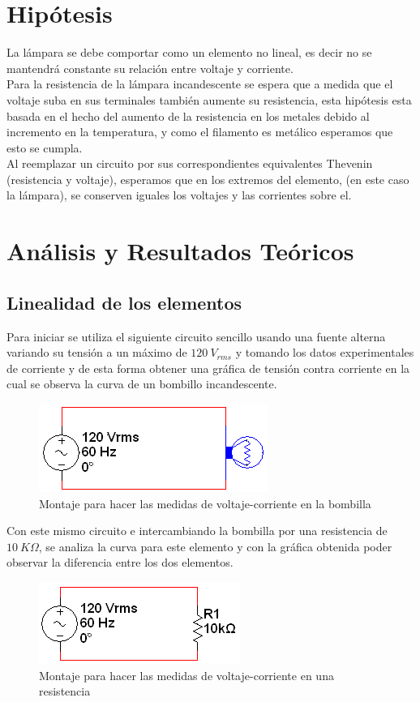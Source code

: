 \documentclass[twocolumn]{IEEEtran}
\begin{document}
\section{Hipótesis}
\noindent
La lámpara se debe comportar como un elemento no lineal, es decir no se mantendrá constante su relación entre voltaje y corriente. \\
Para la resistencia de la lámpara incandescente se espera que a medida que el voltaje suba en sus terminales también aumente su resistencia, esta hipótesis esta basada  en el hecho del aumento de la resistencia en los metales debido al incremento en la temperatura, y como el filamento es metálico esperamos que esto se cumpla.\\
Al reemplazar un circuito por sus correspondientes equivalentes Thevenin (resistencia y voltaje), esperamos que en los extremos del  elemento, (en este caso la lámpara), se conserven iguales los voltajes y las corrientes sobre el.


\section{Análisis y Resultados Teóricos}
\subsection{Linealidad de los elementos}
\noindent
Para iniciar se utiliza el siguiente circuito sencillo usando una fuente  alterna variando su tensión a un máximo de $120 \ V_{rms}$ y tomando los datos experimentales de corriente y de esta forma obtener una gráfica de tensión contra corriente en la cual se observa la curva de un bombillo incandescente.
\begin{figure}[H]
	\centering
		\includegraphics[scale=1]{b1.png}
	\caption{Montaje para hacer las medidas de voltaje-corriente en la bombilla}
	\label{fig3}
\end{figure}
\noindent
Con este mismo circuito e intercambiando la bombilla por una resistencia de $10 \ K \Omega$, se analiza la curva para este elemento y con la gráfica obtenida poder observar la diferencia entre los dos elementos.
\begin{figure}[H]
	\centering
		\includegraphics[scale=1]{b2.png}
	\caption{Montaje para hacer las medidas de voltaje-corriente en una resistencia}
	\label{fig4}
\end{figure}
\end{document}
